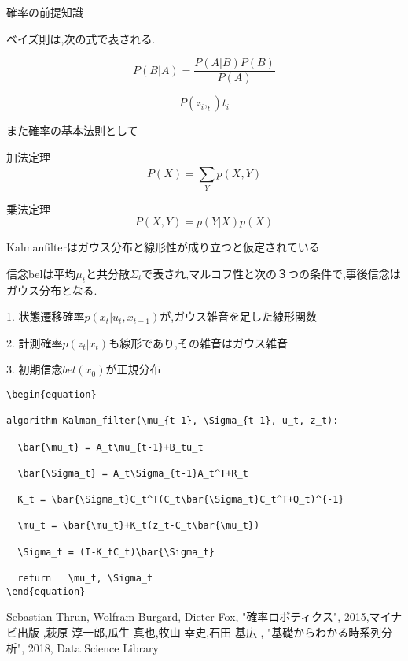 \documentclass[12pt]{jsarticle}
\begin{document}
確率の前提知識

ベイズ則は,次の式で表される.

\begin{equation}
  P(B|A) = \frac{P(A|B)P(B)}{P(A)}
\end{equation}

\begin{equation}
 P(z_i,_t){t_i}
\end{equation}

また確率の基本法則として

加法定理
\begin{equation}
  P(X)=\sum_{Y}^{}{p(X,Y)}
\end{equation}

乗法定理
\begin{equation}
  P(X,Y)=p(Y|X)p(X)
\end{equation}


Kalmanfilterはガウス分布と線形性が成り立つと仮定されている

信念belは平均$\mu_t$と共分散$\Sigma_t$で表され,マルコフ性と次の３つの条件で,事後信念はガウス分布となる.

1. 状態遷移確率$p(x_t|u_t,x_{t-1})$が,ガウス雑音を足した線形関数

2. 計測確率$p(z_t|x_t)$も線形であり,その雑音はガウス雑音

3. 初期信念$bel(x_0)$が正規分布

\begin{lstlisting}[basicstyle=\ttfamily\footnotesize, frame=single]
\begin{equation}

algorithm Kalman_filter(\mu_{t-1}, \Sigma_{t-1}, u_t, z_t):

  \bar{\mu_t} = A_t\mu_{t-1}+B_tu_t

  \bar{\Sigma_t} = A_t\Sigma_{t-1}A_t^T+R_t

  K_t = \bar{\Sigma_t}C_t^T(C_t\bar{\Sigma_t}C_t^T+Q_t)^{-1}

  \mu_t = \bar{\mu_t}+K_t(z_t-C_t\bar{\mu_t})

  \Sigma_t = (I-K_tC_t)\bar{\Sigma_t}

  return   \mu_t, \Sigma_t
\end{equation}
\end{lstlisting}

\begin{thebibliography}{9}
  Sebastian Thrun, Wolfram Burgard, Dieter Fox, "確率ロボティクス", 2015,マイナビ出版 
  ,萩原 淳一郎,瓜生 真也,牧山 幸史,石田 基広 , "基礎からわかる時系列分析", 2018, Data Science Library
\end{thebibliography}
\end{document}
